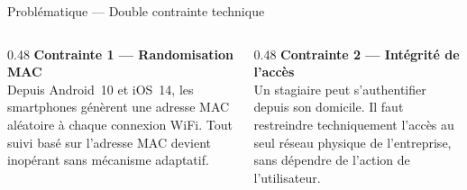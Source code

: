 \documentclass[aspectratio=169, 10pt]{beamer}
\begin{document}
{\begin{frame}{Problématique --- Double contrainte technique}
  \vspace{0.4cm}
  \begin{columns}[T]
    \begin{column}{0.48\textwidth}
      \textcolor{EMESlightblue}{\scriptsize\textbf{Contrainte 1 --- Randomisation MAC}}\\[3pt]
      \scriptsize\textcolor{white!80}{Depuis Android~10 et iOS~14, les smartphones génèrent une adresse MAC aléatoire à chaque connexion WiFi. Tout suivi basé sur l'adresse MAC devient inopérant sans mécanisme adaptatif.}
    \end{column}
    \begin{column}{0.48\textwidth}
      \textcolor{EMESlightblue}{\scriptsize\textbf{Contrainte 2 --- Intégrité de l'accès}}\\[3pt]
      \scriptsize\textcolor{white!80}{Un stagiaire peut s'authentifier depuis son domicile. Il faut restreindre techniquement l'accès au seul réseau physique de l'entreprise, sans dépendre de l'action de l'utilisateur.}
    \end{column}
  \end{columns}
\end{frame}
}
\end{document}
